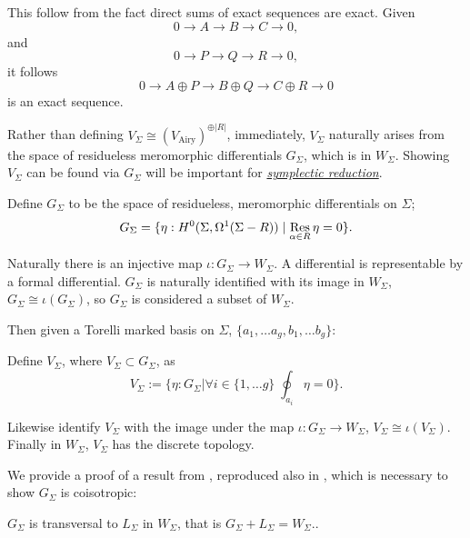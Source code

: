        
        This follow from the fact direct sums of exact sequences are exact. Given
        \[ 0 \rightarrow A \rightarrow B \rightarrow C \rightarrow 0,\]
        and
        \[ 0 \rightarrow P \rightarrow Q \rightarrow R \rightarrow 0,\]
        it follows
        \[  0 \rightarrow A \oplus P \rightarrow B \oplus Q \rightarrow C \oplus R \rightarrow 0 \]
        is an exact sequence.


        Rather than defining \( V_\Sigma \cong (V_{\mathrm{Airy}})^{\oplus |R|}\), immediately, \(V_\Sigma\) naturally arises from the space of residueless meromorphic differentials \(G_\Sigma\), which is in \(W_\Sigma\).
        Showing \(V_\Sigma\) can be found via \(G_\Sigma\) will be important for \hyperref[chapter:symplecticreduction]{\emph{symplectic reduction}}.
        \begin{defn}     
        Define \(G_\Sigma\) to be the space of residueless, meromorphic differentials on \(\Sigma\);
        \[ G_\Sigma=\{ \eta :  H^0(\Sigma,\Omega^1(\Sigma-R)) \mid \operatorname*{Res}_{\alpha \in R}\eta=0 \}. \] 
        \end{defn}    

        Naturally there is an injective map \(\iota : G_\Sigma \rightarrow W_\Sigma\). A differential is representable by a formal differential. \(G_\Sigma\) is naturally identified with its image in \(W_\Sigma\), \( G_\Sigma \cong \iota(G_\Sigma)\), so \(G_\Sigma\) is considered a subset of \(W_\Sigma\). 
        
        Then given a Torelli marked basis on \(\Sigma\), \( \{ a_1, \dots a_g, b_1, \dots b_g\}\):
            
        \begin{defn} Define \( V_\Sigma \), where \(V_\Sigma \subset G_\Sigma \), as 
        \[ V_\Sigma := \{ \eta : G_\Sigma   | \forall i \in \{1,\dots g\} \; \oint_{a_i} \eta = 0\}. \]
        \end{defn}
        Likewise identify \(V_\Sigma\) with the image under the map \(\iota: G_\Sigma \rightarrow W_\Sigma\), \(V_\Sigma \cong \iota (V_\Sigma)\). Finally in \(W_\Sigma\), \(V_\Sigma\) has the discrete topology.
        
        We provide a proof of a result from \cite{ks_airy}, reproduced also in \cite{chaimanowong2020airy}, which is necessary to show \( G_\Sigma\) is coisotropic:
        \begin{prop} \(G_\Sigma\) is transversal to \(L_\Sigma \) in \(W_\Sigma\), that is
        \( G_\Sigma + L_\Sigma = W_\Sigma. \).
        \end{prop}
        
